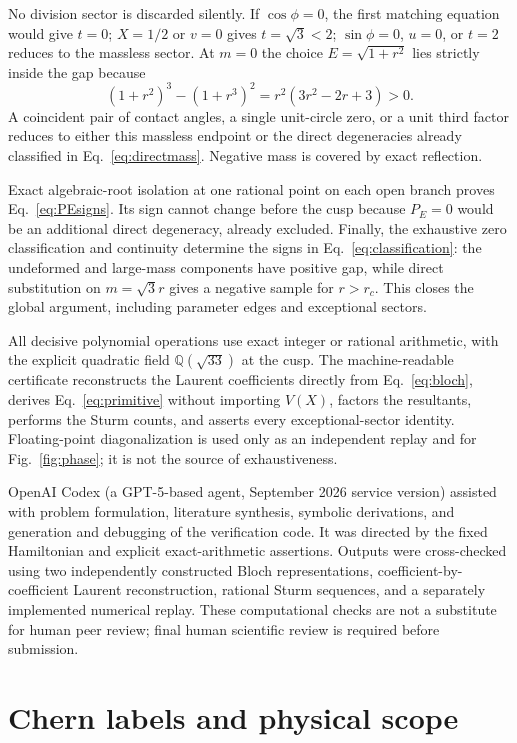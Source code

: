 \documentclass[aps,prb,preprint,superscriptaddress,nofootinbib]{revtex4-2}
\begin{document}
No division sector is discarded silently.  If $\cos\phi=0$, the first
matching equation would give $t=0$; $X=1/2$ or $v=0$ gives
$t=\sqrt3<2$; $\sin\phi=0$, $u=0$, or $t=2$ reduces to the massless
sector.  At $m=0$ the choice $E=\sqrt{1+r^2}$ lies strictly inside the gap
because
\begin{equation}
(1+r^2)^3-(1+r^3)^2=r^2(3r^2-2r+3)>0.
\end{equation}
A coincident pair of contact angles, a single unit-circle zero, or a unit
third factor reduces to either this massless endpoint or the direct
degeneracies already classified in Eq.~\eqref{eq:directmass}.  Negative mass
is covered by exact reflection.

Exact algebraic-root isolation at one rational point on each open branch
proves Eq.~\eqref{eq:PEsigns}.  Its sign cannot change before the cusp because
$P_E=0$ would be an additional direct degeneracy, already excluded.  Finally,
the exhaustive zero classification and continuity determine the signs in
Eq.~\eqref{eq:classification}: the undeformed and large-mass components have
positive gap, while direct substitution on $m=\sqrt3r$ gives a negative
sample for $r>r_c$.  This closes the global argument, including parameter
edges and exceptional sectors.

All decisive polynomial operations use exact integer or rational arithmetic,
with the explicit quadratic field $\mathbb Q(\sqrt{33})$ at the cusp.  The
machine-readable certificate reconstructs the Laurent coefficients directly
from Eq.~\eqref{eq:bloch}, derives Eq.~\eqref{eq:primitive} without importing
$V(X)$, factors the resultants, performs the Sturm counts, and asserts every
exceptional-sector identity.  Floating-point diagonalization is used only as
an independent replay and for Fig.~\ref{fig:phase}; it is not the source of
exhaustiveness.

OpenAI Codex (a GPT-5-based agent, September 2026 service version) assisted
with problem formulation, literature synthesis, symbolic derivations, and
generation and debugging of the verification code.  It was directed by the
fixed Hamiltonian and explicit exact-arithmetic assertions.  Outputs were
cross-checked using two independently constructed Bloch representations,
coefficient-by-coefficient Laurent reconstruction, rational Sturm sequences,
and a separately implemented numerical replay.  These computational checks
are not a substitute for human peer review; final human scientific review is
required before submission.

\section{Chern labels and physical scope}
\label{sec:chern}
\end{document}
